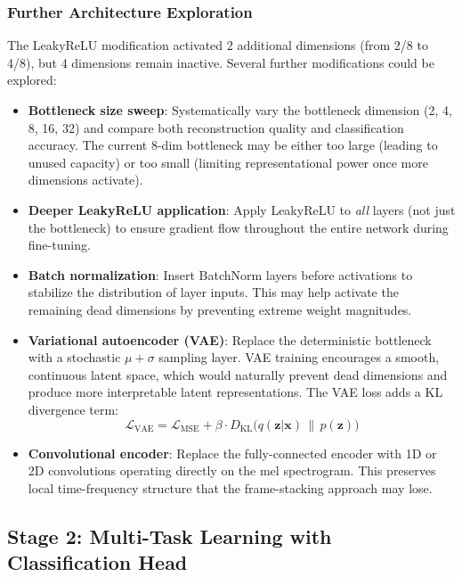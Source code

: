 \documentclass[12pt, a4paper]{article}
\begin{document}
\subsubsection{Further Architecture Exploration}

The LeakyReLU modification activated 2 additional dimensions (from 2/8 to 4/8), but 4 dimensions remain inactive. Several further modifications could be explored:

\begin{itemize}
    \item \textbf{Bottleneck size sweep}: Systematically vary the bottleneck dimension (2, 4, 8, 16, 32) and compare both reconstruction quality and classification accuracy. The current 8-dim bottleneck may be either too large (leading to unused capacity) or too small (limiting representational power once more dimensions activate).
    \item \textbf{Deeper LeakyReLU application}: Apply LeakyReLU to \emph{all} layers (not just the bottleneck) to ensure gradient flow throughout the entire network during fine-tuning.
    \item \textbf{Batch normalization}: Insert BatchNorm layers before activations to stabilize the distribution of layer inputs. This may help activate the remaining dead dimensions by preventing extreme weight magnitudes.
    \item \textbf{Variational autoencoder (VAE)}: Replace the deterministic bottleneck with a stochastic $\mu + \sigma$ sampling layer. VAE training encourages a smooth, continuous latent space, which would naturally prevent dead dimensions and produce more interpretable latent representations. The VAE loss adds a KL divergence term:
    \begin{equation}
        \mathcal{L}_{\text{VAE}} = \mathcal{L}_{\text{MSE}} + \beta \cdot D_{\text{KL}}\big(q(\mathbf{z}|\mathbf{x}) \,\|\, p(\mathbf{z})\big)
    \end{equation}
    \item \textbf{Convolutional encoder}: Replace the fully-connected encoder with 1D or 2D convolutions operating directly on the mel spectrogram. This preserves local time-frequency structure that the frame-stacking approach may lose.
\end{itemize}

\subsection{Stage 2: Multi-Task Learning with Classification Head}
\label{sec:stage2}
\end{document}
